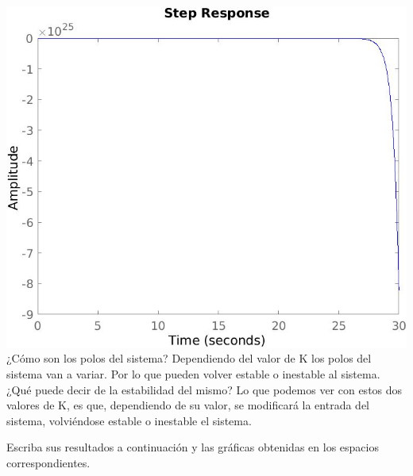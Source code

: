 \includegraphics[scale=0.36]{./img2/G6.jpg}\\
¿Cómo son los polos del sistema? Dependiendo del valor de K los polos del sistema van a variar. Por lo que pueden volver estable o inestable al sistema.\\
¿Qué puede decir de la estabilidad del mismo? Lo que podemos ver con estos dos valores de K, es que, dependiendo de su valor, se modificará la entrada del sistema, volviéndose estable o inestable el sistema.



	Escriba sus resultados a continuación y las gráficas obtenidas en los espacios correspondientes.



